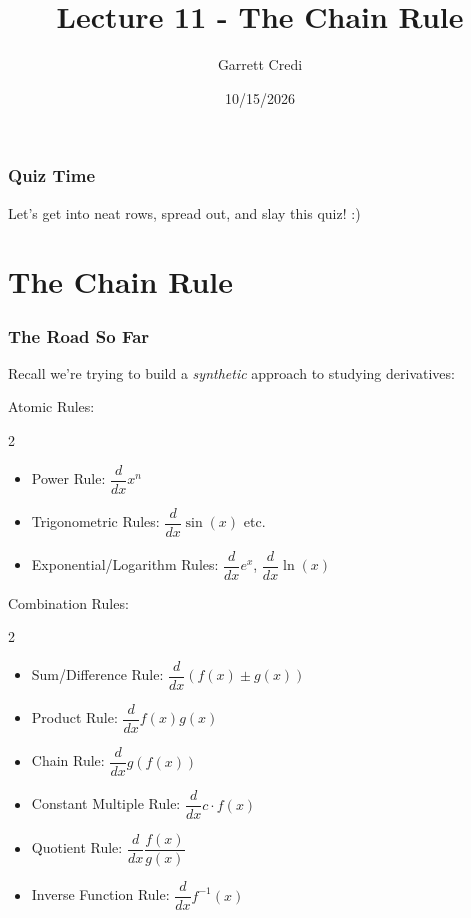 \documentclass{ltx-talk}
\title{Lecture 11 - The Chain Rule}
\author{Garrett Credi}
\date{10/15/2026}
\begin{document}
\begin{frame}
  \maketitle 
\end{frame}

\begin{frame}
  \frametitle{Quiz Time}

  Let's get into neat rows, spread out, and slay this quiz! :)
\end{frame}

\section{The Chain Rule}

\begin{frame}
  \frametitle{The Road So Far}
    Recall we're trying to build a \textit{synthetic} approach to studying derivatives: \pause

    Atomic Rules: \pause
  \begin{multicols}{2}
    \begin{itemize}
      \item Power Rule: $\dfrac{d}{dx} x^n$ 
      \item Trigonometric Rules: $\dfrac{d}{dx} \sin(x)$ etc.
      \item Exponential/Logarithm Rules: $\dfrac{d}{dx} e^x$, $\dfrac{d}{dx} \ln(x)$
    \end{itemize}
  \end{multicols}

  Combination Rules: \pause
  \begin{multicols}{2}
    \begin{itemize}
      \item Sum/Difference Rule: $\dfrac{d}{dx} (f(x) \pm g(x))$ 
      \item Product Rule: $\dfrac{d}{dx} f(x)g(x)$ 
      \item Chain Rule: $\dfrac{d}{dx} g(f(x))$ 
      \item Constant Multiple Rule: $\dfrac{d}{dx} c \cdot f(x)$
      \item Quotient Rule: $\dfrac{d}{dx} \dfrac{f(x)}{g(x)}$ 
      \item Inverse Function Rule: $\dfrac{d}{dx} f^{-1}(x)$
    \end{itemize}
  \end{multicols}
\end{frame}
\end{document}
